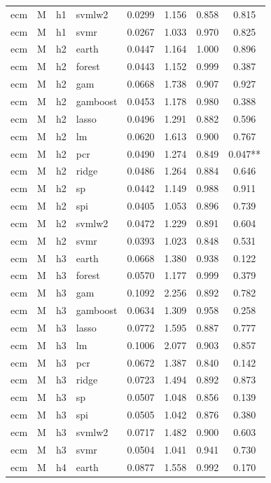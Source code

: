 \begin{ThreePartTable}
\begin{longtable}[t]{llclcccc}
ecm & M & h1 & svmlw2 & 0.0299 & 1.156 & 0.858 & 0.815\\
ecm & M & h1 & svmr & 0.0267 & 1.033 & 0.970 & 0.825\\
\addlinespace
ecm & M & h2 & earth & 0.0447 & 1.164 & 1.000 & 0.896\\
ecm & M & h2 & forest & 0.0443 & 1.152 & 0.999 & 0.387\\
ecm & M & h2 & gam & 0.0668 & 1.738 & 0.907 & 0.927\\
ecm & M & h2 & gamboost & 0.0453 & 1.178 & 0.980 & 0.388\\
ecm & M & h2 & lasso & 0.0496 & 1.291 & 0.882 & 0.596\\
ecm & M & h2 & lm & 0.0620 & 1.613 & 0.900 & 0.767\\
ecm & M & h2 & pcr & 0.0490 & 1.274 & 0.849 & 0.047**\\
ecm & M & h2 & ridge & 0.0486 & 1.264 & 0.884 & 0.646\\
ecm & M & h2 & sp & 0.0442 & 1.149 & 0.988 & 0.911\\
ecm & M & h2 & spi & 0.0405 & 1.053 & 0.896 & 0.739\\
ecm & M & h2 & svmlw2 & 0.0472 & 1.229 & 0.891 & 0.604\\
ecm & M & h2 & svmr & 0.0393 & 1.023 & 0.848 & 0.531\\
\addlinespace
ecm & M & h3 & earth & 0.0668 & 1.380 & 0.938 & 0.122\\
ecm & M & h3 & forest & 0.0570 & 1.177 & 0.999 & 0.379\\
ecm & M & h3 & gam & 0.1092 & 2.256 & 0.892 & 0.782\\
ecm & M & h3 & gamboost & 0.0634 & 1.309 & 0.958 & 0.258\\
ecm & M & h3 & lasso & 0.0772 & 1.595 & 0.887 & 0.777\\
ecm & M & h3 & lm & 0.1006 & 2.077 & 0.903 & 0.857\\
ecm & M & h3 & pcr & 0.0672 & 1.387 & 0.840 & 0.142\\
ecm & M & h3 & ridge & 0.0723 & 1.494 & 0.892 & 0.873\\
ecm & M & h3 & sp & 0.0507 & 1.048 & 0.856 & 0.139\\
ecm & M & h3 & spi & 0.0505 & 1.042 & 0.876 & 0.380\\
ecm & M & h3 & svmlw2 & 0.0717 & 1.482 & 0.900 & 0.603\\
ecm & M & h3 & svmr & 0.0504 & 1.041 & 0.941 & 0.730\\
\addlinespace
ecm & M & h4 & earth & 0.0877 & 1.558 & 0.992 & 0.170\\

\end{longtable}
\end{ThreePartTable}
